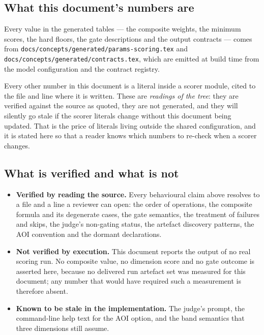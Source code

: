 \documentclass[11pt,a4paper]{article}
\newcommand{\code}[1]{\texttt{#1}}
\begin{document}
\subsection{What this document's numbers are}

Every value in the generated tables --- the composite weights, the minimum
scores, the hard floors, the gate descriptions and the output contracts ---
comes from \code{docs/concepts/generated/params-scoring.tex} and
\code{docs/concepts/generated/contracts.tex}, which are emitted at build
time from the model configuration and the contract registry.

Every other number in this document is a literal inside a scorer module,
cited to the file and line where it is written. These are \emph{readings of
the tree}: they are verified against the source as quoted, they are not
generated, and they will silently go stale if the scorer literals change
without this document being updated. That is the price of literals living
outside the shared configuration, and it is stated here so that a reader
knows which numbers to re-check when a scorer changes.

\subsection{What is verified and what is not}

\begin{itemize}
\item \textbf{Verified by reading the source.} Every behavioural claim above
      resolves to a file and a line a reviewer can open: the order of
      operations, the composite formula and its degenerate cases, the gate
      semantics, the treatment of failures and skips, the judge's
      non-gating status, the artefact discovery patterns, the AOI convention
      and the dormant declarations.
\item \textbf{Not verified by execution.} This document reports the output of
      no real scoring run. No composite value, no dimension score and no
      gate outcome is asserted here, because no delivered run artefact set
      was measured for this document; any number that would have required
      such a measurement is therefore absent.
\item \textbf{Known to be stale in the implementation.} The judge's prompt,
      the command-line help text for the AOI option, and the band semantics
      that three dimensions still assume.
\end{itemize}
\end{document}
